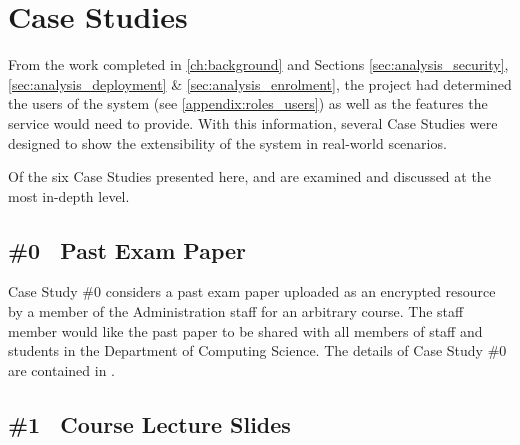 \section{Case Studies}
\label{sec:analysis_case_studies}

From the work completed in \cref{ch:background} and Sections \ref{sec:analysis_security}, \ref{sec:analysis_deployment} \& \ref{sec:analysis_enrolment}, the project had determined the users of the \theResServer system (see \cref{appendix:roles_users}) as well as the features the service would need to provide. With this information, several Case Studies were designed to show the extensibility of the system in real-world scenarios.

Of the six Case Studies presented here,  and  are examined and discussed at the most in-depth level.

\subsection{\#0 \textemdash\ Past Exam Paper}
\label{subsec:analysis_case_studies_0}

Case Study \#0 considers a past exam paper uploaded as an encrypted resource by a member of the Administration staff for an arbitrary course. The staff member would like the past paper to be shared with all members of staff and students in the Department of Computing Science. The details of Case Study \#0 are contained in .

\subsection{\#1 \textemdash\ Course Lecture Slides}
\label{subsec:analysis_case_studies_1}

